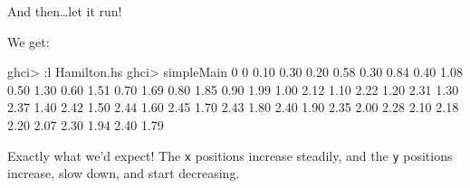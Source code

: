 \documentclass[]{article}
\newenvironment{Shaded}{}{}
\newcommand{\DataTypeTok}[1]{\textcolor[rgb]{0.56,0.13,0.00}{#1}}
\newcommand{\DecValTok}[1]{\textcolor[rgb]{0.25,0.63,0.44}{#1}}
\newcommand{\FloatTok}[1]{\textcolor[rgb]{0.25,0.63,0.44}{#1}}
\newcommand{\CommentTok}[1]{\textcolor[rgb]{0.38,0.63,0.69}{\textit{#1}}}
\newcommand{\OtherTok}[1]{\textcolor[rgb]{0.00,0.44,0.13}{#1}}
\newcommand{\FunctionTok}[1]{\textcolor[rgb]{0.02,0.16,0.49}{#1}}
\newcommand{\NormalTok}[1]{#1}
\begin{document}
And then\ldots{}let it run!

\begin{Shaded}
\end{Shaded}

We get:

\begin{Shaded}
\begin{Highlighting}[]
\NormalTok{ghci}\FunctionTok{>} \FunctionTok{:}\NormalTok{l Hamilton.hs}
\NormalTok{ghci}\FunctionTok{>}\NormalTok{ simpleMain}
\DecValTok{0}     \DecValTok{0}
\FloatTok{0.10}  \FloatTok{0.30}
\FloatTok{0.20}  \FloatTok{0.58}
\FloatTok{0.30}  \FloatTok{0.84}
\FloatTok{0.40}  \FloatTok{1.08}
\FloatTok{0.50}  \FloatTok{1.30}
\FloatTok{0.60}  \FloatTok{1.51}
\FloatTok{0.70}  \FloatTok{1.69}
\FloatTok{0.80}  \FloatTok{1.85}
\FloatTok{0.90}  \FloatTok{1.99}
\FloatTok{1.00}  \FloatTok{2.12}
\FloatTok{1.10}  \FloatTok{2.22}
\FloatTok{1.20}  \FloatTok{2.31}
\FloatTok{1.30}  \FloatTok{2.37}
\FloatTok{1.40}  \FloatTok{2.42}
\FloatTok{1.50}  \FloatTok{2.44}
\FloatTok{1.60}  \FloatTok{2.45}
\FloatTok{1.70}  \FloatTok{2.43}
\FloatTok{1.80}  \FloatTok{2.40}
\FloatTok{1.90}  \FloatTok{2.35}
\FloatTok{2.00}  \FloatTok{2.28}
\FloatTok{2.10}  \FloatTok{2.18}
\FloatTok{2.20}  \FloatTok{2.07}
\FloatTok{2.30}  \FloatTok{1.94}
\FloatTok{2.40}  \FloatTok{1.79}
\end{Highlighting}
\end{Shaded}

Exactly what we'd expect! The \texttt{x} positions increase steadily, and the
\texttt{y} positions increase, slow down, and start decreasing.
\end{document}
